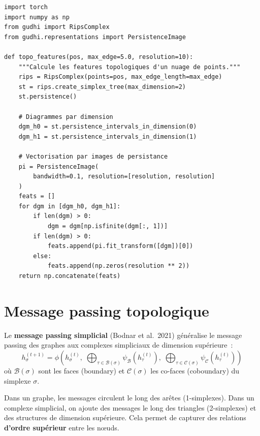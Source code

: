 \begin{verbatim}
import torch
import numpy as np
from gudhi import RipsComplex
from gudhi.representations import PersistenceImage

def topo_features(pos, max_edge=5.0, resolution=10):
    """Calcule les features topologiques d'un nuage de points."""
    rips = RipsComplex(points=pos, max_edge_length=max_edge)
    st = rips.create_simplex_tree(max_dimension=2)
    st.persistence()

    # Diagrammes par dimension
    dgm_h0 = st.persistence_intervals_in_dimension(0)
    dgm_h1 = st.persistence_intervals_in_dimension(1)

    # Vectorisation par images de persistance
    pi = PersistenceImage(
        bandwidth=0.1, resolution=[resolution, resolution]
    )
    feats = []
    for dgm in [dgm_h0, dgm_h1]:
        if len(dgm) > 0:
            dgm = dgm[np.isfinite(dgm[:, 1])]
        if len(dgm) > 0:
            feats.append(pi.fit_transform([dgm])[0])
        else:
            feats.append(np.zeros(resolution ** 2))
    return np.concatenate(feats)
\end{verbatim}

\section{Message passing topologique}
\label{sec:message_passing_topo}

\begin{definition}
Le \textbf{message passing simplicial} (Bodnar et al.\ 2021)
g\'en\'eralise le message passing des graphes aux complexes
simpliciaux de dimension sup\'erieure~:
\[
  h_\sigma^{(t+1)} = \phi\!\left(h_\sigma^{(t)},\;
  \bigoplus_{\tau \in \mathcal{B}(\sigma)} \psi_{\mathcal{B}}(h_\tau^{(t)}),\;
  \bigoplus_{\tau \in \mathcal{C}(\sigma)} \psi_{\mathcal{C}}(h_\tau^{(t)})
  \right)
\]
o\`u $\mathcal{B}(\sigma)$ sont les faces (boundary) et
$\mathcal{C}(\sigma)$ les co-faces (coboundary) du simplexe $\sigma$.
\end{definition}

\begin{intuition}
Dans un graphe, les messages circulent le long des ar\^etes
(1-simplexes). Dans un complexe simplicial, on ajoute des messages
le long des triangles (2-simplexes) et des structures de dimension
sup\'erieure. Cela permet de capturer des relations
\textbf{d'ordre sup\'erieur} entre les n\oe uds.
\end{intuition}

